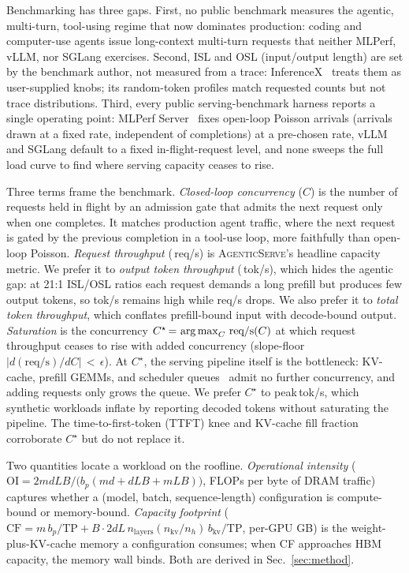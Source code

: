 Benchmarking has three gaps. First, no public benchmark measures the agentic, multi-turn, tool-using regime that now dominates production: coding and computer-use agents issue long-context multi-turn requests that neither MLPerf, vLLM, nor SGLang exercises. Second, ISL and OSL (input/output length) are set by the benchmark author, not measured from a trace: InferenceX~\citep{inferencex} treats them as user-supplied knobs; its random-token profiles match requested counts but not trace distributions. Third, every public serving-benchmark harness reports a single operating point: MLPerf Server~\citep{mlperf} fixes open-loop Poisson arrivals (arrivals drawn at a fixed rate, independent of completions) at a pre-chosen rate, vLLM and SGLang default to a fixed in-flight-request level, and none sweeps the full load curve to find where serving capacity ceases to rise.

Three terms frame the benchmark. \textit{Closed-loop concurrency} ($C$) is the number of requests held in flight by an admission gate that admits the next request only when one completes. It matches production agent traffic, where the next request is gated by the previous completion in a tool-use loop, more faithfully than open-loop Poisson. \textit{Request throughput} ($\,$req/s) is \textsc{AgenticServe}'s headline capacity metric. We prefer it to \textit{output token throughput} ($\,$tok/s), which hides the agentic gap: at 21:1 ISL/OSL ratios each request demands a long prefill but produces few output tokens, so tok/s remains high while req/s drops. We also prefer it to \textit{total token throughput}, which conflates prefill-bound input with decode-bound output. \textit{Saturation} is the concurrency $C^{\star}\,{=}\,\operatorname*{arg\,max}_{C}\,\text{req/s}(C)$ at which request throughput ceases to rise with added concurrency (slope-floor $|d(\text{req/s})/dC|\,{<}\,\epsilon$). At $C^{\star}$, the serving pipeline itself is the bottleneck: KV-cache, prefill GEMMs, and scheduler queues~\citep{sarathi} admit no further concurrency, and adding requests only grows the queue. We prefer $C^{\star}$ to peak$\,$tok/s, which synthetic workloads inflate by reporting decoded tokens without saturating the pipeline. The time-to-first-token (TTFT) knee and KV-cache fill fraction corroborate $C^{\star}$ but do not replace it.

Two quantities locate a workload on the roofline. \textit{Operational intensity} ($\text{OI} = 2mdLB / \bigl(b_p(md + dLB + mLB)\bigr)$, FLOPs per byte of DRAM traffic) captures whether a (model, batch, sequence-length) configuration is compute-bound or memory-bound. \textit{Capacity footprint} ($\text{CF} = m\,b_p / \text{TP} + B \cdot 2dL\,n_{\text{layers}}(n_{\text{kv}}/n_h)\,b_{\text{kv}} / \text{TP}$, per-GPU GB) is the weight-plus-KV-cache memory a configuration consumes; when CF approaches HBM capacity, the memory wall binds. Both are derived in Sec.~\ref{sec:method}.

